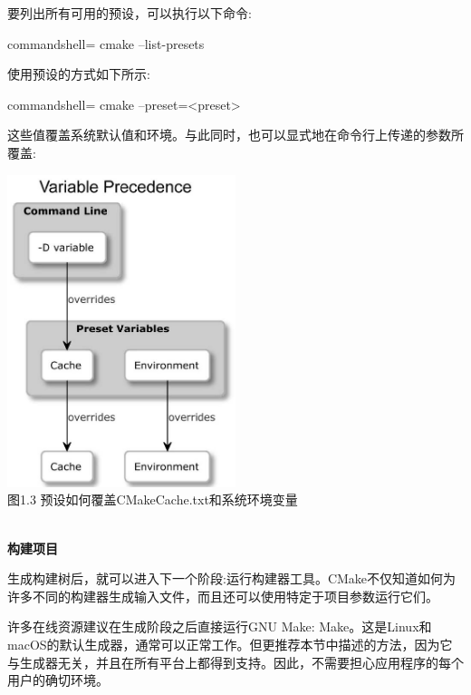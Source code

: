 要列出所有可用的预设，可以执行以下命令:

\begin{tcblisting}{commandshell={}}
cmake --list-presets
\end{tcblisting}

使用预设的方式如下所示:

\begin{tcblisting}{commandshell={}}
cmake --preset=<preset>
\end{tcblisting}

这些值覆盖系统默认值和环境。与此同时，也可以显式地在命令行上传递的参数所覆盖:

\begin{center}
\includegraphics[width=0.5\textwidth]{content/1/chapter1/images/3.jpg}\\
图1.3 预设如何覆盖CMakeCache.txt和系统环境变量
\end{center}

\hspace*{\fill} \\ %
\noindent
\textbf{构建项目}

生成构建树后，就可以进入下一个阶段:运行构建器工具。CMake不仅知道如何为许多不同的构建器生成输入文件，而且还可以使用特定于项目参数运行它们。

\begin{tcolorbox}[colback=red!5!white,colframe=red!75!black,title=不推荐]
许多在线资源建议在生成阶段之后直接运行GNU Make: Make。这是Linux和macOS的默认生成器，通常可以正常工作。但更推荐本节中描述的方法，因为它与生成器无关，并且在所有平台上都得到支持。因此，不需要担心应用程序的每个用户的确切环境。
\end{tcolorbox}

